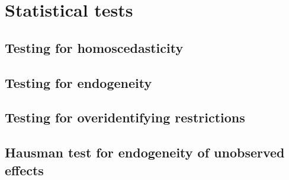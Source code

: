 \section{Statistical tests}
\label{app:statistical_tests}

\subsection{Testing for homoscedasticity}
\label{app:homoscedasticity}

\subsection{Testing for endogeneity}
\label{app:endogeneity}

\subsection{Testing for overidentifying restrictions}
\label{app:overidentifying}

\subsection{Hausman test for endogeneity of unobserved effects}
\label{app:hausman}
